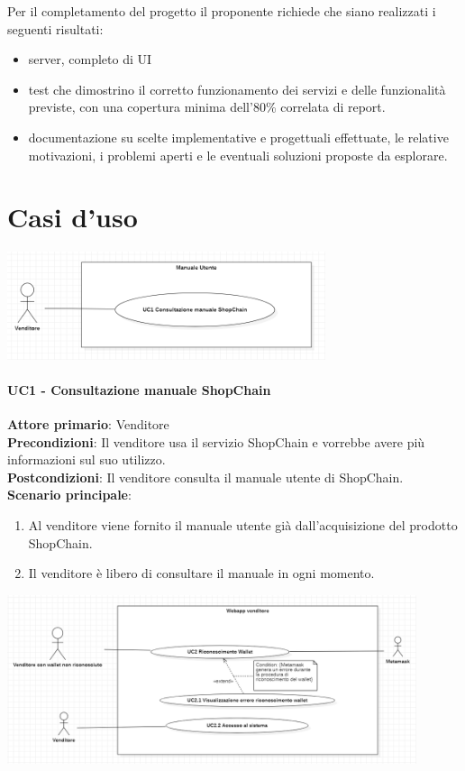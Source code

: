 \documentclass[a4paper, 12pt]{article}
\begin{document}
Per il completamento del progetto il proponente richiede che siano realizzati i seguenti risultati:
\begin{itemize}
\item server, completo di UI
\item test che dimostrino il corretto funzionamento dei servizi e delle funzionalità previste, con una copertura minima dell'80\% correlata di report.
\item documentazione su scelte implementative e progettuali effettuate, le relative motivazioni, i problemi aperti e le eventuali soluzioni proposte da esplorare.
\end{itemize}

\section{Casi d'uso}

\includegraphics[width=0.7\textwidth]{UseCase_venditore1.png}

\paragraph{UC1 - Consultazione manuale ShopChain}
\textbf{Attore primario}: Venditore\\
\textbf{Precondizioni}: Il venditore usa il servizio ShopChain e vorrebbe avere più informazioni sul suo utilizzo.\\
\textbf{Postcondizioni}: Il venditore consulta il manuale utente di ShopChain.\\
\textbf{Scenario principale}:\\
\begin{enumerate}
\item Al venditore viene fornito il manuale utente già dall'acquisizione del prodotto ShopChain.
\item Il venditore è libero di consultare il manuale in ogni momento.
\end{enumerate}

\includegraphics[width=0.9\textwidth]{UseCase_venditore2.png}
\end{document}
